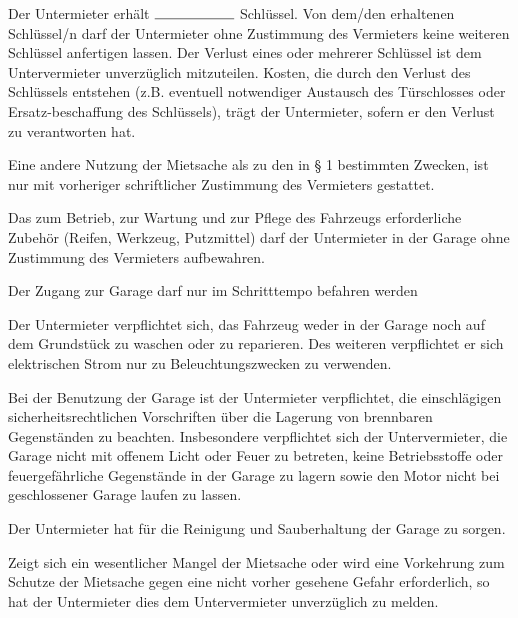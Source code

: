 \documentclass[a4paper]{scrartcl}
\begin{document}

Der Untermieter erhält $\rule{2cm}{.15mm}$ Schlüssel.  Von  dem/den  erhaltenen Schlüssel/n  darf  der  Untermieter  ohne Zustimmung  des  Vermieters  keine weiteren Schlüssel anfertigen lassen. Der Verlust eines oder mehrerer 
Schlüssel ist dem Untervermieter unverzüglich mitzuteilen. Kosten,  die  durch  den  Verlust  des  Schlüssels  entstehen  
(z.B.  eventuell  notwendiger  Austausch  des  Türschlosses  oder  Ersatz-beschaffung des Schlüssels), trägt 
der Untermieter, sofern er den Verlust zu verantworten hat. 



Eine andere Nutzung der Mietsache als zu den in § 1 bestimmten Zwecken, ist nur mit vorheriger schriftlicher 
Zustimmung des Vermieters gestattet.
\vspace{3mm}

\noindent
Das  zum  Betrieb,  zur  Wartung  und  zur  Pflege  des  Fahrzeugs  erforderliche  Zubehör  (Reifen,  
Werkzeug,  Putzmittel)  darf  der  Untermieter in der Garage ohne Zustimmung des Vermieters aufbewahren. 
\vspace{3mm}

\noindent
Der Zugang zur Garage darf nur im Schritttempo befahren werden
\vspace{3mm}

\noindent
Der Untermieter verpflichtet sich, das Fahrzeug weder in der Garage noch auf dem Grundstück zu waschen oder
zu reparieren. Des weiteren verpflichtet er sich elektrischen Strom nur zu Beleuchtungszwecken zu verwenden.
\vspace{3mm}


\noindent
Bei der Benutzung der Garage ist der Untermieter verpflichtet, die einschlägigen sicherheitsrechtlichen Vorschriften 
über die Lagerung von brennbaren Gegenständen zu beachten. Insbesondere verpflichtet sich der Untervermieter,  die Garage nicht mit offenem Licht oder Feuer zu betreten, keine Betriebsstoffe oder feuergefährliche Gegenstände in der
Garage zu lagern sowie den Motor nicht bei geschlossener Garage laufen zu lassen.


Der Untermieter hat für die Reinigung und Sauberhaltung der Garage zu sorgen.
\vspace{3mm}

\noindent
Zeigt sich ein wesentlicher Mangel der Mietsache oder wird eine Vorkehrung zum Schutze der Mietsache 
gegen eine nicht vorher gesehene Gefahr erforderlich, so hat der Untermieter dies dem Untervermieter unverzüglich zu melden. 
\end{document}
